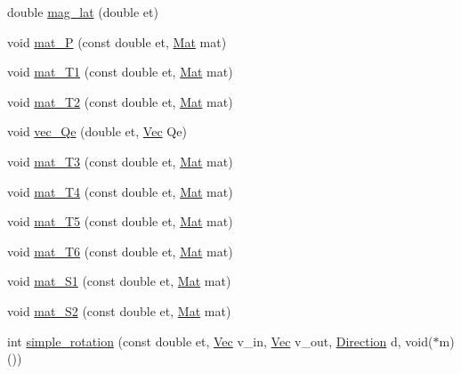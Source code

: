 \begin{DoxyCompactItemize}
\item 
double \hyperlink{cxform-manual_8c_a380fc5b86f178fed6314b59950502db0}{mag\-\_\-lat} (double et)
\item 
void \hyperlink{cxform-manual_8c_ae0edc19e9ac91fd407df9d5939ed7cbc}{mat\-\_\-\-P} (const double et, \hyperlink{cxform_8h_a89c340f4673cd75af597763b492a8fa1}{Mat} mat)
\item 
void \hyperlink{cxform-manual_8c_a98c3af0a095c65f0b7dcdab5266f25c8}{mat\-\_\-\-T1} (const double et, \hyperlink{cxform_8h_a89c340f4673cd75af597763b492a8fa1}{Mat} mat)
\item 
void \hyperlink{cxform-manual_8c_a84c6ff0c06e5c7ad41c4d8d9487bda2b}{mat\-\_\-\-T2} (const double et, \hyperlink{cxform_8h_a89c340f4673cd75af597763b492a8fa1}{Mat} mat)
\item 
void \hyperlink{cxform-manual_8c_a522caf9f987d9c69985928f7fb7a8742}{vec\-\_\-\-Qe} (double et, \hyperlink{cxform_8h_ae351b761259db318a538251033f3cb27}{Vec} Qe)
\item 
void \hyperlink{cxform-manual_8c_acbaa169f9742954d6de645bc8aae0d20}{mat\-\_\-\-T3} (const double et, \hyperlink{cxform_8h_a89c340f4673cd75af597763b492a8fa1}{Mat} mat)
\item 
void \hyperlink{cxform-manual_8c_aca10bea08cb0c11d8d45e4b48efe7582}{mat\-\_\-\-T4} (const double et, \hyperlink{cxform_8h_a89c340f4673cd75af597763b492a8fa1}{Mat} mat)
\item 
void \hyperlink{cxform-manual_8c_a2e103e2894e1477eb617d2406d3fe7a2}{mat\-\_\-\-T5} (const double et, \hyperlink{cxform_8h_a89c340f4673cd75af597763b492a8fa1}{Mat} mat)
\item 
void \hyperlink{cxform-manual_8c_aa313856959777af854d098b3aad74dd1}{mat\-\_\-\-T6} (const double et, \hyperlink{cxform_8h_a89c340f4673cd75af597763b492a8fa1}{Mat} mat)
\item 
void \hyperlink{cxform-manual_8c_ab4055dbc0aecc2717083821822523421}{mat\-\_\-\-S1} (const double et, \hyperlink{cxform_8h_a89c340f4673cd75af597763b492a8fa1}{Mat} mat)
\item 
void \hyperlink{cxform-manual_8c_a107b24e1f7a19f0d1777285ce21ed46a}{mat\-\_\-\-S2} (const double et, \hyperlink{cxform_8h_a89c340f4673cd75af597763b492a8fa1}{Mat} mat)
\item 
int \hyperlink{cxform-manual_8c_a6a21c6d7c236c5643d401407d7fa8a26}{simple\-\_\-rotation} (const double et, \hyperlink{cxform_8h_ae351b761259db318a538251033f3cb27}{Vec} v\-\_\-in, \hyperlink{cxform_8h_ae351b761259db318a538251033f3cb27}{Vec} v\-\_\-out, \hyperlink{cxform_8h_abc151ba67b4c70f0e8dc3fe894264aa1}{Direction} d, void($\ast$m)())

\end{DoxyCompactItemize}
